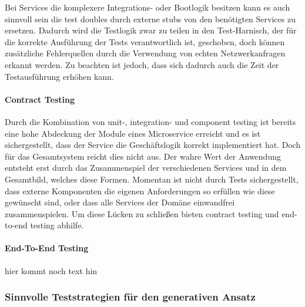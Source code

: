 \documentclass[12pt,a4paper,bibliography=totocnumbered,listof=totocnumbered]{scrartcl}
\begin{document}

Bei Services die komplexere Integrations- oder Bootlogik besitzen kann es auch sinnvoll sein die test doubles durch externe stubs von den benötigten Services zu ersetzen. Dadurch wird die Testlogik zwar zu teilen in den Test-Harnisch, der für die korrekte Ausführung der Tests verantwortlich ist, geschoben, doch können zusätzliche Fehlerquellen durch die Verwendung von echten Netzwerkanfragen erkannt werden. Zu beachten ist jedoch, dass sich dadurch auch die Zeit der Testausführung erhöhen kann.\cite{clemson}

\paragraph{Contract Testing}

Durch die Kombination von unit-, integration- und component testing ist bereits eine hohe Abdeckung der Module eines Microservice erreicht und es ist sichergestellt, dass der Service die Geschäftslogik korrekt implementiert hat. Doch für das Gesamtsystem reicht dies nicht aus. Der wahre Wert der Anwendung entsteht erst durch das Zusammenspiel der verschiedenen Services und in dem Gesamtbild, welches diese Formen. Momentan ist nicht durch Tests sichergestellt, dass externe Komponenten die eigenen Anforderungen so erfüllen wie diese gewünscht sind, oder dass alle Services der Domäne einwandfrei zusammenspielen.\cite{clemson} Um diese Lücken zu schließen bieten contract testing und end-to-end testing abhilfe.




\paragraph{End-To-End Testing}

hier kommt noch text hin


\subsubsection{Sinnvolle Teststrategien für den generativen Ansatz}\label{ch:ms-gen-test}
\end{document}
